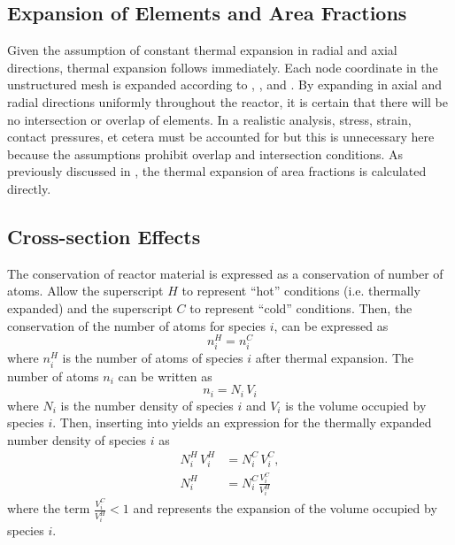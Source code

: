   \subsection{Expansion of Elements and Area Fractions}
    Given the assumption of constant thermal expansion in radial and axial
    directions, thermal expansion follows immediately. Each node coordinate in
    the unstructured mesh is expanded according to , 
    , and . By expanding in axial and radial
    directions uniformly throughout the reactor, it is certain that there will 
    be no intersection or overlap of elements. In a realistic analysis, stress,
    strain, contact pressures, et cetera must be accounted for but this is 
    unnecessary here because the assumptions prohibit overlap and intersection 
    conditions.  As previously discussed in
    , the thermal expansion of
    area fractions is calculated directly.

  \subsection{Cross-section Effects}
    \label{sec:cross-section_effects}
    The conservation of reactor material is expressed as a conservation of 
    number of atoms. Allow the superscript $H$ to represent ``hot'' conditions 
    (i.e.  thermally expanded) and the superscript $C$ to represent ``cold'' 
    conditions.  Then, the conservation of the number of atoms for species $i$, 
    can be expressed as
    \begin{equation}
      \label{eq:conservation}
      n_i^H = n_i^C 
    \end{equation}
    where $n_i^H$ is the number of atoms of species $i$ after thermal expansion.
    The number of atoms $n_i$ can be written as 
    \begin{equation}
      \label{eq:nden_definition}
      n_i = N_i \, V_i
    \end{equation}
    where $N_i$ is the number density of species $i$ and $V_i$ is the volume
    occupied by species $i$. Then, inserting  into 
     yields an expression for the thermally expanded 
    number density of species $i$ as
    \begin{align}
      N_i^H \, V_i^H &= N_i^C \, V_i^C, \\
      \label{eq:nden_volume_ratio}
      N_i^H &= N_i^C \frac{V_i^C}{V_i^H}
    \end{align}
    where the term $\frac{V_i^C}{V_i^H} < 1$ and represents the expansion of the
    volume occupied by species $i$. 

